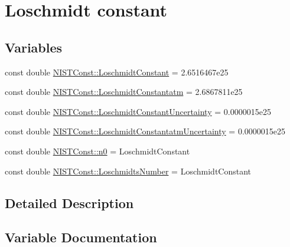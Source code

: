 \hypertarget{group___loschmidt_constant}{}\section{Loschmidt constant}
\label{group___loschmidt_constant}
\subsection*{Variables}
\begin{DoxyCompactItemize}
\item 
const double \hyperlink{group___loschmidt_constant_gab4ddc03e855109d251efa0ae9e8fb80d}{N\+I\+S\+T\+Const\+::\+Loschmidt\+Constant} = 2.\+6516467e25
\item 
const double \hyperlink{group___loschmidt_constant_ga1442f26c5c9f899f74ef7b546a41c461}{N\+I\+S\+T\+Const\+::\+Loschmidt\+Constantatm} = 2.\+6867811e25
\item 
const double \hyperlink{group___loschmidt_constant_gae1bf8845a08d0554f1045083a143c30a}{N\+I\+S\+T\+Const\+::\+Loschmidt\+Constant\+Uncertainty} = 0.\+0000015e25
\item 
const double \hyperlink{group___loschmidt_constant_gaed8885c8d2d27d9d8b88c271e0022228}{N\+I\+S\+T\+Const\+::\+Loschmidt\+Constantatm\+Uncertainty} = 0.\+0000015e25
\item 
const double \hyperlink{group___loschmidt_constant_ga95b0a12ed1a4d5aa9f05a08927be123c}{N\+I\+S\+T\+Const\+::n0} = Loschmidt\+Constant
\item 
const double \hyperlink{group___loschmidt_constant_gaf6143a6202718104ded1b92da2a0217f}{N\+I\+S\+T\+Const\+::\+Loschmidts\+Number} = Loschmidt\+Constant
\end{DoxyCompactItemize}


\subsection{Detailed Description}


\subsection{Variable Documentation}
\mbox{\label{group___loschmidt_constant_gab4ddc03e855109d251efa0ae9e8fb80d}} 
